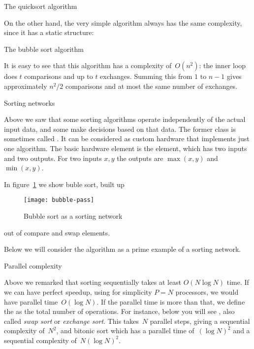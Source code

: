 \begin{displayalgorithm}
  \caption{The quicksort algorithm}
\end{displayalgorithm}

On the other hand, the very simple  algorithm
always has the same complexity, since it has a static structure:

\begin{displayalgorithm}
  \caption{The bubble sort algorithm}
\end{displayalgorithm}

It is easy to see that this algorithm has a complexity of~$O(n^2)$:
the inner loop does $t$ comparisons and up to $t$ exchanges. Summing
this from $1$ to $n-1$ gives approximately $n^2/2$ comparisons and
at most the same number of exchanges.

 {Sorting networks}

Above we saw that some sorting algorithms operate independently of the
actual input data, and some make decisions based on that data.
The former class is sometimes
called . It can be considered
as custom hardware that implements just one algorithm. The 
basic hardware element is the 
element, which has two inputs and two outputs. For two inputs $x,y$
the outputs are $\max(x,y)$ and $\min(x,y)$.

In figure~\ref{fig:bubble-pass} we show buble sort, built up
%
\begin{figure}[ht]
  \texttt{[image: bubble-pass]}
  \caption{Bubble sort as a sorting network}
  \label{fig:bubble-pass}
\end{figure}
%
out of compare and swap elements.

Below we will consider the  algorithm
as a prime example of a sorting network.

 {Parallel complexity}

Above we remarked that sorting sequentially takes at least $O(N\log N)$ time.
If we can have perfect speedup, using for simplicity $P=N$ processors,
we would have parallel time~$O(\log N)$. If the parallel time
is more than that, we define the 
as the total number of operations. For instance, below you will see
,
also called \emph{swap sort}
or \emph{exchange sort}.
This takes~$N$ parallel steps,
giving a sequential complexity of~$N^2$, and bitonic sort
which has a parallel time of~$(\log N)^2$ and a
sequential complexity of~$N(\log N)^2$.

